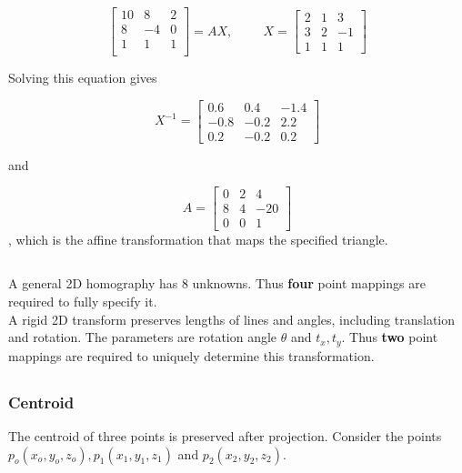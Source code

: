 \documentclass[a4paper,10pt]{scrartcl}
\begin{document}
\[ \begin{bmatrix}
      10 & 8 & 2 \\
      8 & -4 & 0 \\
      1 & 1 & 1\\
   \end{bmatrix} = AX,
   \hspace{1cm}X = \begin{bmatrix}
      2 & 1 & 3\\
      3 & 2 & -1\\
      1 & 1 & 1
   \end{bmatrix}
\]

Solving this equation gives

\[ X^{-1} = 
  \begin{bmatrix}
      0.6 & 0.4 & -1.4\\
      -0.8 & -0.2 & 2.2\\
      0.2 & -0.2 & 0.2
   \end{bmatrix}\]
   
and

\[
  A =   \begin{bmatrix}
      0 & 2 & 4\\
      8 & 4 & -20\\
      0 & 0 & 1
   \end{bmatrix}\], which is the affine transformation that maps the specified triangle.
   
\subsection{}

A general 2D homography has 8 unknowns. Thus {\bfseries four} point mappings are required to fully specify it.\\

A rigid 2D transform preserves lengths of lines and angles, including translation and rotation. The parameters are rotation angle $\theta$ and $t_x, t_y$. Thus {\bfseries two} point mappings
are required to uniquely determine this transformation.


\subsection{}
\subsubsection{Centroid}
The centroid of three points is preserved after projection. Consider the points $p_o(x_o, y_o, z_o), p_1(x_1, y_1, z_1)$ and $p_2(x_2, y_2, z_2)$. 
\end{document}
